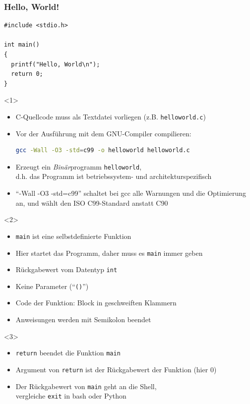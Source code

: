 \documentclass{slides}
\begin{document}
\begin{frame}[fragile]
  \frametitle{Hello, World!}

  \begin{lstlisting}
#include <stdio.h>

int main()
{
  printf("Hello, World\n");
  return 0;
}
\end{lstlisting}

  \begin{onlyenv}<1>
    \begin{itemize}
    \item C-\alert{Quellcode} muss als Textdatei vorliegen (z.B. \lstinline!helloworld.c!)
    \item Vor der Ausführung mit dem GNU-Compiler \alert{compilieren}:
\begin{lstlisting}[frame={},language=bash]
gcc -Wall -O3 -std=c99 -o helloworld helloworld.c
\end{lstlisting}
    \item Erzeugt ein \emph{Binär}programm \lstinline!helloworld!,\\
      d.h. das Programm ist betriebssystem- und architekturspezifisch
    \item "`-Wall -O3 -std=c99"' schaltet bei gcc alle Warnungen und die Optimierung an,
      und wählt den ISO C99-Standard anstatt C90
    \end{itemize}
  \end{onlyenv}

  \begin{onlyenv}<2>
    \begin{itemize}
    \item \lstinline!main! ist eine selbstdefinierte \alert{Funktion}
    \item Hier startet das Programm, daher muss es \lstinline!main! immer geben
    \item Rückgabewert vom \alert{Datentyp} \lstinline!int!
    \item Keine Parameter ("`\lstinline!()!"')
    \item Code der Funktion: Block in geschweiften Klammern
    \item Anweisungen werden mit Semikolon beendet
    \end{itemize}
  \end{onlyenv}

  \begin{onlyenv}<3>
    \begin{itemize}
    \item {\alerted\lstinline!return!} beendet die Funktion \lstinline!main!
    \item Argument von \lstinline!return! ist der Rückgabewert der Funktion (hier 0)
    \item Der Rückgabewert von \lstinline!main! geht an die Shell,\\
      vergleiche \lstinline!exit! in bash oder Python
    \end{itemize}
  \end{onlyenv}


\end{frame}
\end{document}
